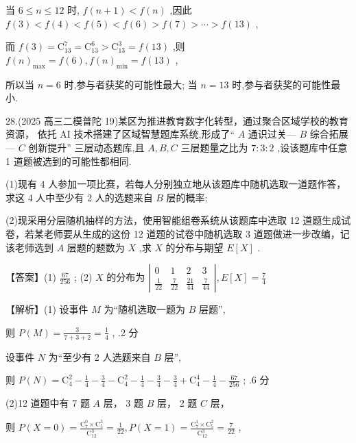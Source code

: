 \documentclass[10pt]{article}
\begin{document}
当 \(6 \leq  n \leq  {12}\) 时, \(f\left( {n + 1}\right)  < f\left( n\right)\) ,因此 \(f\left( 3\right)  < f\left( 4\right)  < f\left( 5\right)  < f\left( 6\right)  > f\left( 7\right)  > \cdots  > f\left( {13}\right)\) ,

而 \(f\left( 3\right)  = {\mathrm{C}}_{13}^{7} = {\mathrm{C}}_{13}^{6} > {\mathrm{C}}_{13}^{3} = f\left( {13}\right)\) ,则 \(f{\left( n\right) }_{\max } = f\left( 6\right) ,f{\left( n\right) }_{\min } = f\left( {13}\right)\) ,

所以当 \(n = 6\) 时,参与者获奖的可能性最大; 当 \(n = {13}\) 时,参与者获奖的可能性最小.

28.(2025 高三二模普陀 19)某区为推进教育数字化转型，通过聚合区域学校的教育资源， 依托 AI 技术搭建了区域智慧题库系统,形成了“ \(A\) 通识过关— \(B\) 综合拓展— \(C\) 创新提升” 三层动态题库,且 \(A,B,C\) 三层题量之比为 \(7 : 3 : 2\) ,设该题库中任意 1 道题被选到的可能性都相同.

(1)现有 4 人参加一项比赛，若每人分别独立地从该题库中随机选取一道题作答，求这 4 人中至少有 2 人的选题来自 \(B\) 层的概率;

(2)现采用分层随机抽样的方法，使用智能组卷系统从该题库中选取 12 道题生成试卷，若某老师要从生成的这份 12 道题的试卷中随机选取 3 道题做进一步改编，记该老师选到 \(A\) 层题的题数为 \(X\) ,求 \(X\) 的分布与期望 \(E\left\lbrack  X\right\rbrack\) .

【答案】(1) \(\frac{67}{256}\) ; (2) \(X\) 的分布为 \(\left| \begin{matrix} 0 & 1 & 2 & 3 \\  \frac{1}{22} & \frac{7}{22} & \frac{21}{44} & \frac{7}{44} \end{matrix}\right| ,E\left\lbrack  X\right\rbrack   = \frac{7}{4}\)

【解析】(1) 设事件 \(M\) 为“随机选取一题为 \(B\) 层题”,

则 \(P\left( M\right)  = \frac{3}{7 + 3 + 2} = \frac{1}{4}\) , .2 分

设事件 \(N\) 为“至少有 2 人选题来自 \(B\) 层”,

则 \(P\left( N\right)  = {\mathrm{C}}_{4}^{2} - \frac{1}{4} - \frac{3}{4} - {\mathrm{C}}_{4}^{2} - \frac{1}{4} - \frac{3}{4} - \frac{3}{4} + {\mathrm{C}}_{4}^{4} - \frac{1}{4} - \frac{67}{256}\) ; .6 分

(2)12 道题中有 7 题 \(A\) 层， 3 题 \(B\) 层， 2 题 \(C\) 层，

则 \(P\left( {X = 0}\right)  = \frac{{\mathrm{C}}_{7}^{0} \times  {\mathrm{C}}_{5}^{3}}{{\mathrm{C}}_{12}^{3}} = \frac{1}{22},P\left( {X = 1}\right)  = \frac{{\mathrm{C}}_{7}^{1} \times  {\mathrm{C}}_{5}^{2}}{{\mathrm{C}}_{12}^{3}} = \frac{7}{22}\) ,
\end{document}

